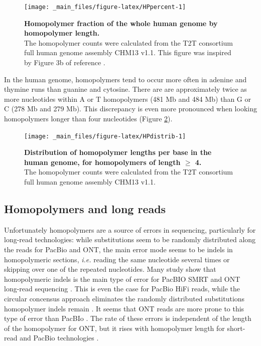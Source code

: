 \documentclass[
  11pt,
  twoside]{scrbook}
\begin{document}
\begin{figure}

{\centering \texttt{[image: \_main\_files/figure-latex/HPpercent-1]} 

}

\caption[Homopolymer fraction of the whole human genome by homopolymer length.]{\textbf{Homopolymer fraction of the whole human genome by homopolymer length.}\\The homopolymer counts were calculated from the T2T consortium full human genome assembly CHM13 v1.1. This figure was inspired by Figure 3b of reference \autocite{booeshaghiPseudoalignmentFacilitatesAssignment2022}.}\label{fig:HPpercent}
\end{figure}

In the human genome, homopolymers tend to occur more often in adenine and thymine runs than guanine and cytosine. There are are approximately twice as more nucleotides within A or T homopolymers (481 Mb and 484 Mb) than G or C (278 Mb and 279 Mb). This discrepancy is even more pronounced when looking homopolymers longer than four nucleotides (Figure \ref{fig:HPdistrib}).

\begin{figure}

{\centering \texttt{[image: \_main\_files/figure-latex/HPdistrib-1]} 

}

\caption[Distribution of homopolymer lengths per base in the human genome, for homopolymers of length $\geq$ 4.]{\textbf{Distribution of homopolymer lengths per base in the human genome, for homopolymers of length $\geq$ 4.}\\The homopolymer counts were calculated from the T2T consortium full human genome assembly CHM13 v1.1.}\label{fig:HPdistrib}
\end{figure}

\hypertarget{homopolymers-and-long-reads}{%
\subsection{Homopolymers and long reads}\label{homopolymers-and-long-reads}}

Unfortunately homopolymers are a source of errors in sequencing, particularly for long-read technologies: while substitutions seem to be randomly distributed along the reads for PacBio and ONT, the main error mode seems to be indels in homopolymeric sections, \emph{i.e.} reading the same nucleotide several times or skipping over one of the repeated nucleotides. Many study show that homopolymeric indels is the main type of error for PacBIO SMRT and ONT long-read sequencing \autocite{delahaye2021,goodwin2015,dohmBenchmarkingLongreadCorrection2020,weirather2017}. This is even the case for PacBio HiFi reads, while the circular concensus approach eliminates the randomly distributed substitutions homopolymer indels remain \autocite{wenger2019}. It seems that ONT reads are more prone to this type of error than PacBIo \autocite{logsdonLongreadHumanGenome2020}. The rate of these errors is independent of the length of the homopolymer for ONT, but it rises with homopolymer length for short-read and PacBio technologies \autocite{fooxPerformanceAssessmentDNA2021}.
\end{document}
